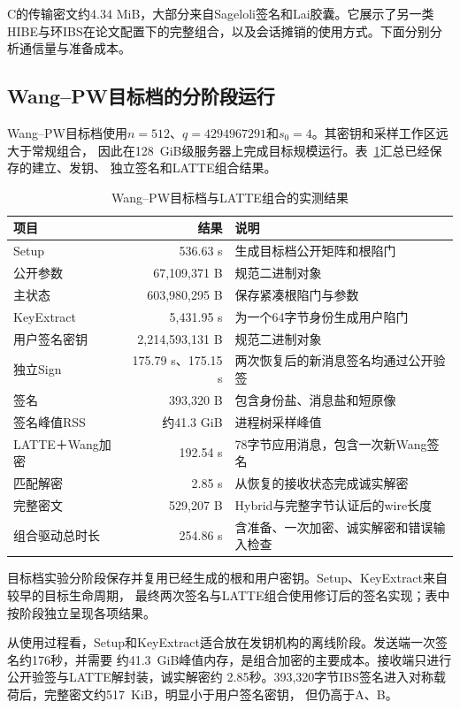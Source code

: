 C的传输密文约4.34 MiB，大部分来自Sageloli签名和Lai胶囊。它展示了另一类HIBE与环IBS在论文配置下的完整组合，以及会话摊销的使用方式。下面分别分析通信量与准备成本。

\subsection{Wang--PW目标档的分阶段运行}

Wang--PW目标档使用$n=512$、$q=4294967291$和$s_0=4$。其密钥和采样工作区远大于常规组合，
因此在128~GiB级服务器上完成目标规模运行。表~\ref{tab:wang-results}汇总已经保存的建立、发钥、
独立签名和LATTE组合结果。

\begin{table}[H]
\centering\small
\caption{Wang--PW目标档与LATTE组合的实测结果}
\label{tab:wang-results}
\begin{tabularx}{\textwidth}{@{}p{}rX@{}}
\toprule
\rowcolor{black!8} 项目 & 结果 & 说明 \\
\midrule
Setup & 536.63 s & 生成目标档公开矩阵和根陷门 \\
公开参数 & 67,109,371 B & 规范二进制对象 \\
主状态 & 603,980,295 B & 保存紧凑根陷门与参数 \\
KeyExtract & 5,431.95 s & 为一个64字节身份生成用户陷门 \\
用户签名密钥 & 2,214,593,131 B & 规范二进制对象 \\
独立Sign & 175.79 s、175.15 s & 两次恢复后的新消息签名均通过公开验签 \\
签名 & 393,320 B & 包含身份盐、消息盐和短原像 \\
签名峰值RSS & 约41.3 GiB & 进程树采样峰值 \\
LATTE＋Wang加密 & 192.54 s & 78字节应用消息，包含一次新Wang签名 \\
匹配解密 & 2.85 s & 从恢复的接收状态完成诚实解密 \\
完整密文 & 529,207 B & Hybrid与完整字节认证后的wire长度 \\
组合驱动总时长 & 254.86 s & 含准备、一次加密、诚实解密和错误输入检查 \\
\bottomrule
\end{tabularx}
\end{table}

目标档实验分阶段保存并复用已经生成的根和用户密钥。Setup、KeyExtract来自较早的目标生命周期，
最终两次签名与LATTE组合使用修订后的签名实现；表中按阶段独立呈现各项结果。

从使用过程看，Setup和KeyExtract适合放在发钥机构的离线阶段。发送端一次签名约176秒，并需要
约41.3~GiB峰值内存，是组合加密的主要成本。接收端只进行公开验签与LATTE解封装，诚实解密约
2.85秒。393,320字节IBS签名进入对称载荷后，完整密文约517~KiB，明显小于用户签名密钥，
但仍高于A、B。


